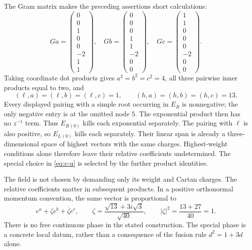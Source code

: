 \begin{example}
The Gram matrix makes the preceding assertions short calculations:
\[
 Ga=\begin{pmatrix}0\\0\\1\\0\\0\\-2\\1\\1\end{pmatrix},
 \quad
 Gb=\begin{pmatrix}0\\0\\0\\1\\1\\-2\\0\\0\end{pmatrix},
 \quad
 Gc=\begin{pmatrix}1\\1\\0\\0\\0\\-2\\0\\0\end{pmatrix}.
\]
Taking coordinate dot products gives
$a^2=b^2=c^2=4$, all three pairwise inner products equal to
two, and
\[
 (\ell,a)=(\ell,b)=(\ell,c)=1,\qquad
 (h,a)=(h,b)=(h,c)=13.
\]
Every displayed pairing with a simple root occurring in $E_R$
is nonnegative; the only negative entry is at the omitted node
$5$. The exponential product then has no $z^{-1}$ term.
Thus $E_R{}_{(0)}$ kills each exponential separately.
The pairing with $\ell$ is also positive, so $E_L{}_{(0)}$
kills each separately. Their linear span is already a
three-dimensional space of highest vectors with the same charges.
Highest-weight conditions alone therefore leave their relative
coefficients undetermined. The special choice in
\eqref{eq:c-u} is selected by the further product identities.
\end{example}

The field is not chosen by demanding only its weight and Cartan charges.
The relative coefficients matter in subsequent products. In a positive
orthonormal momentum convention, the same vector is proportional to
\[
 e^a+\zeta e^b+\overline\zeta e^c,
 \qquad \zeta=\frac{\sqrt{13}+3i\sqrt3}{\sqrt{40}},
 \qquad |\zeta|^2=\frac{13+27}{40}=1.
\]
There is no free continuous phase in the stated construction. The
special phase is a concrete local datum, rather than a consequence of
the fusion rule $d^2=1+3d$ alone.

